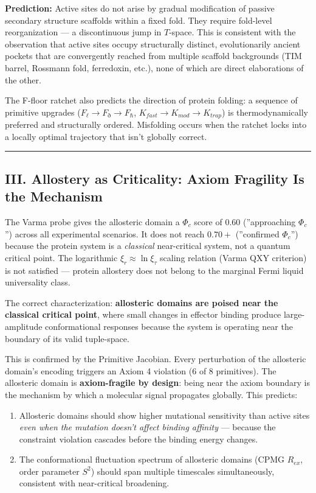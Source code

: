 \documentclass[12pt,a4paper]{article}
\begin{document}
\textbf{Prediction:} Active sites do not arise by gradual modification of passive secondary structure scaffolds within a fixed fold. They require fold-level reorganization --- a discontinuous jump in $T$-space. This is consistent with the observation that active sites occupy structurally distinct, evolutionarily ancient pockets that are convergently reached from multiple scaffold backgrounds (TIM barrel, Rossmann fold, ferredoxin, etc.), none of which are direct elaborations of the other.

The F-floor ratchet also predicts the direction of protein folding: a sequence of primitive upgrades ($F_\ell \to F_\eth \to F_\hbar$, $K_{fast} \to K_{mod} \to K_{trap}$) is thermodynamically preferred and structurally ordered. Misfolding occurs when the ratchet locks into a locally optimal trajectory that isn't globally correct.

\begin{center}
\rule{0.5\textwidth}{0.4pt}
\end{center}

\subsection{III. Allostery as Criticality: Axiom Fragility Is the Mechanism}

The Varma probe gives the allosteric domain a $\Phi_c$ score of $0.60$ (''approaching $\Phi_c$'') across all experimental scenarios. It does not reach $0.70+$ (''confirmed $\Phi_c$'') because the protein system is a \emph{classical} near-critical system, not a quantum critical point. The logarithmic $\xi_r \approx \ln \xi_\tau$ scaling relation (Varma QXY criterion) is not satisfied --- protein allostery does not belong to the marginal Fermi liquid universality class.

The correct characterization: \textbf{allosteric domains are poised near the classical critical point}, where small changes in effector binding produce large-amplitude conformational responses because the system is operating near the boundary of its valid tuple-space.

This is confirmed by the Primitive Jacobian. Every perturbation of the allosteric domain's encoding triggers an Axiom 4 violation (6 of 8 primitives). The allosteric domain is \textbf{axiom-fragile by design}: being near the axiom boundary is the mechanism by which a molecular signal propagates globally. This predicts:

\begin{enumerate}
    \item Allosteric domains should show higher mutational sensitivity than active sites \emph{even when the mutation doesn't affect binding affinity} --- because the constraint violation cascades before the binding energy changes.
    \item The conformational fluctuation spectrum of allosteric domains (CPMG $R_{ex}$, order parameter $S^2$) should span multiple timescales simultaneously, consistent with near-critical broadening.
\end{enumerate}
\end{document}
